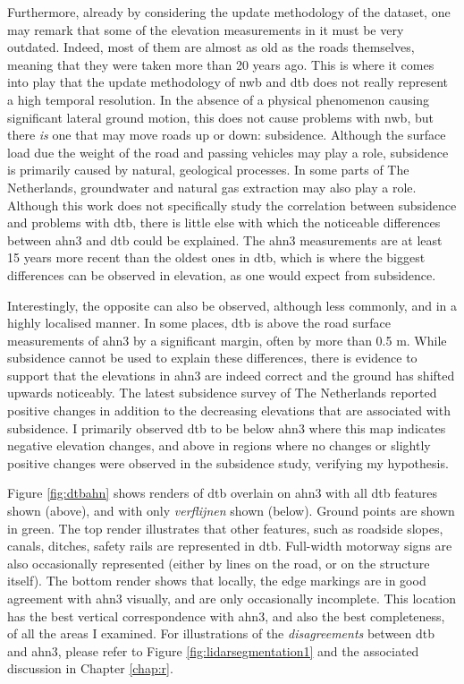 Furthermore, already by considering the update methodology of the dataset, one may remark that some of the elevation measurements in it must be very outdated. Indeed, most of them are almost as old as the roads themselves, meaning that they were taken more than 20 years ago. This is where it comes into play that the update methodology of \ac{nwb} and \ac{dtb} does not really represent a high temporal resolution. In the absence of a physical phenomenon causing significant lateral ground motion, this does not cause problems with \ac{nwb}, but there \textit{is} one that may move roads up or down: subsidence. Although the surface load due the weight of the road and passing vehicles may play a role, subsidence is primarily caused by natural, geological processes. In some parts of The Netherlands, groundwater and natural gas extraction may also play a role. Although this work does not specifically study the correlation between subsidence and problems with \ac{dtb}, there is little else with which the noticeable differences between \ac{ahn3} and \ac{dtb} could be explained. The \ac{ahn3} measurements are at least 15 years more recent than the oldest ones in \ac{dtb}, which is where the biggest differences can be observed in elevation, as one would expect from subsidence.

Interestingly, the opposite can also be observed, although less commonly, and in a highly localised manner. In some places, \ac{dtb} is above the road surface measurements of \ac{ahn3} by a significant margin, often by more than 0.5 m. While subsidence cannot be used to explain these differences, there is evidence to support that the elevations in \ac{ahn3} are indeed correct and the ground has shifted upwards noticeably. The latest subsidence survey of The Netherlands reported positive changes in addition to the decreasing elevations that are associated with subsidence. I primarily observed \ac{dtb} to be below \ac{ahn3} where this map indicates negative elevation changes, and above in regions where no changes or slightly positive changes were observed in the subsidence study, verifying my hypothesis.

Figure \ref{fig:dtbahn} shows renders of \ac{dtb} overlain on \ac{ahn3} with all \ac{dtb} features shown (above), and with only \textit{verflijnen} shown (below). Ground points are shown in green. The top render illustrates that other features, such as roadside slopes, canals, ditches, safety rails are represented in \ac{dtb}. Full-width motorway signs are also occasionally represented (either by lines on the road, or on the structure itself). The bottom render shows that locally, the edge markings are in good agreement with \ac{ahn3} visually, and are only occasionally incomplete. This location has the best vertical correspondence with \ac{ahn3}, and also the best completeness, of all the areas I examined. For illustrations of the \textit{disagreements} between \ac{dtb} and \ac{ahn3}, please refer to Figure \ref{fig:lidarsegmentation1} and the associated discussion in Chapter \ref{chap:r}.

